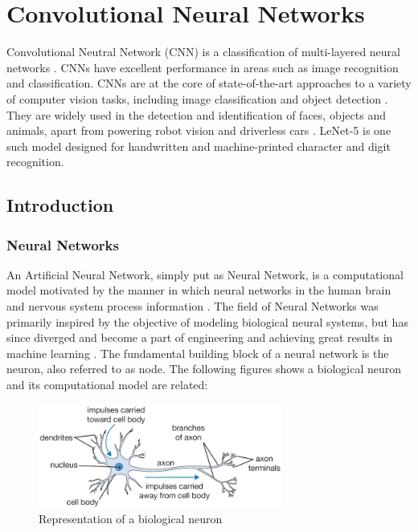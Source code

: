 \chapter{Convolutional Neural Networks}
\label{ch5_cnn}

Convolutional Neutral Network (CNN) is a classification of multi-layered neural networks \cite{cnn_lecun_lenet5}. CNNs have excellent performance in areas such as image recognition and classification.  CNNs are at the core of state-of-the-art approaches to a variety of computer vision tasks, including image classification \cite{kriz_suts_hinton_nips2012} and object detection \cite{gir_don_dar_mal_cvpr2014}. They are widely used in the detection and identification of faces, objects and animals, apart from powering robot vision and driverless cars \cite{cnn_karn}. LeNet-5 is one such model designed for handwritten and machine-printed character and digit recognition.

\section{Introduction}
\label{sect5_1}

\subsection{Neural Networks}
\label{sect5_1_1}
An Artificial Neural Network, simply put as Neural Network, is a computational model motivated by the manner in which neural networks in the human brain and nervous system process information \cite{cnn_karn}. The field of Neural Networks was primarily inspired by the objective of modeling biological neural systems, but has since diverged and become a part of engineering and achieving great results in machine learning \cite{nn_stanford_1}. \newline\newline The fundamental building block of a neural network is the neuron, also referred to as node. The following figures shows a biological neuron and its computational model are related: \newline

\begin{figure}[h!]
\centering
\includegraphics[width=8cm]{figures/Neuron.png}
\caption{Representation of a biological neuron\cite{nn_stanford_1}}
\label{fig:cnn1}
\end{figure}

